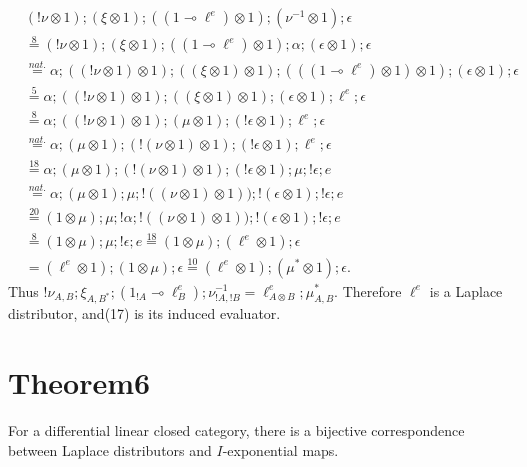 \documentclass[10pt,a4paper]{amsart}
\newcommand{\by}[1]{\overset{\scriptscriptstyle #1}{=}}
\begin{document}
\begin{align*}
&(!\nu\otimes1);(\xi\otimes1);((1\multimap\ell^e)\otimes1);(\nu^{-1}\otimes1);\epsilon\\
&\by{8}(!\nu\otimes1);(\xi\otimes1);((1\multimap\ell^e)\otimes1);\alpha;(\epsilon\otimes1);\epsilon\\
&\by{nat.}\alpha;((!\nu\otimes1)\otimes1);((\xi\otimes1)\otimes1);
(((1\multimap\ell^e)\otimes1)\otimes1);(\epsilon\otimes1);\epsilon\\
&\by{5}\alpha;((!\nu\otimes1)\otimes1);((\xi\otimes1)\otimes1);(\epsilon\otimes1);\ell^e;\epsilon\\
&\by{8}\alpha;((!\nu\otimes1)\otimes1);(\mu\otimes1);(!\epsilon\otimes1);\ell^e;\epsilon\\
&\by{nat.}\alpha;(\mu\otimes1);(!(\nu\otimes1)\otimes1);(!\epsilon\otimes1);\ell^e;\epsilon\\
&\by{18}\alpha;(\mu\otimes1);(!(\nu\otimes1)\otimes1);(!\epsilon\otimes1);\mu;!\epsilon;e\\
&\by{nat.}\alpha;(\mu\otimes1);\mu;!((\nu\otimes1)\otimes1));!(\epsilon\otimes1);!\epsilon;e\\
&\by{20}(1\otimes\mu);\mu;!\alpha;!((\nu\otimes1)\otimes1));!(\epsilon\otimes1);!\epsilon;e\\
&\by{8}(1\otimes\mu);\mu;!\epsilon;e
\by{18}(1\otimes\mu);(\ell^e\otimes1);\epsilon\\
&=(\ell^e\otimes1);(1\otimes\mu);\epsilon
\by{10}(\ell^e\otimes1);(\mu^*\otimes1);\epsilon.
\end{align*}
Thus $!\nu_{A,B};\xi_{A,B^*};(1_{!A}\multimap\ell_B^e);\nu_{!A,!B}^{-1}
=\ell_{A\otimes B}^e;\mu_{A,B}^*$.
Therefore $\ell^e$ is a Laplace distributor, and(17) is its induced evaluator.

\section*{Theorem6}
For a differential linear closed category, there is a bijective correspondence
between Laplace distributors and $I$-exponential maps.

\end{document}
